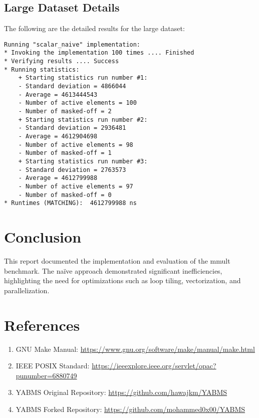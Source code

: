 \documentclass[12pt]{article}
\begin{document}
\subsection{Large Dataset Details}
The following are the detailed results for the large dataset:
\begin{lstlisting}[caption=Large Dataset Execution Details, style=customc]
Running "scalar_naive" implementation:
* Invoking the implementation 100 times .... Finished
* Verifying results .... Success
* Running statistics:
    + Starting statistics run number #1:
    - Standard deviation = 4866044
    - Average = 4613444543
    - Number of active elements = 100
    - Number of masked-off = 2
    + Starting statistics run number #2:
    - Standard deviation = 2936481
    - Average = 4612904698
    - Number of active elements = 98
    - Number of masked-off = 1
    + Starting statistics run number #3:
    - Standard deviation = 2763573
    - Average = 4612799988
    - Number of active elements = 97
    - Number of masked-off = 0
* Runtimes (MATCHING):  4612799988 ns
\end{lstlisting}


\section{Conclusion}
This report documented the implementation and evaluation of the mmult benchmark. The naïve approach demonstrated significant inefficiencies, highlighting the need for optimizations such as loop tiling, vectorization, and parallelization.

\section{References}
\begin{enumerate}
    \item GNU Make Manual: \url{https://www.gnu.org/software/make/manual/make.html}
    \item IEEE POSIX Standard: \url{https://ieeexplore.ieee.org/servlet/opac?punumber=6880749}
    \item YABMS Original Repository: \url{https://github.com/hawajkm/YABMS}
    \item YABMS Forked Repository: \url{https://github.com/mohammed0x00/YABMS}
\end{enumerate}
\end{document}
